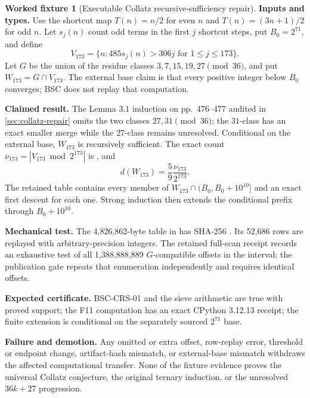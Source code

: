 \documentclass[11pt,a4paper]{article}
\theoremstyle{definition}
\newtheorem{fixture}[definition]{Worked fixture}
\theoremstyle{plain}
\theoremstyle{remark}
\begin{document}
\begin{fixture}[Executable Collatz recursive-sufficiency repair]
\label{fix:collatz-repair}
\textbf{Inputs and types.}
Use the shortcut map \(T(n)=n/2\) for even \(n\) and
\(T(n)=(3n+1)/2\) for odd \(n\).  Let \(s_j(n)\) count odd terms in the
first \(j\) shortcut steps, put \(B_0=2^{71}\), and define
\[
 V_{173}=\{n:485s_j(n)>306j\text{ for }1\le j\le173\}.
\]
Let \(G\) be the union of the residue classes
\(3,7,15,19,27\pmod {36}\), and put \(W_{173}=G\cap V_{173}\).
The external base claim is that every positive integer below \(B_0\)
converges; BSC does not replay that computation.

\textbf{Claimed result.}
The Lemma 3.1 induction on pp.\ 476--477 audited in
\cref{sec:collatz-repair} omits the two classes \(27,31\pmod {36}\);
the \(31\)-class has an exact smaller merge while the \(27\)-class remains
unresolved.  Conditional on the external base, \(W_{173}\) is recursively
sufficient.  The exact count
\(\nu_{173}=|V_{173}\bmod2^{173}|\) is
\texttt{}, and
\[
 d(W_{173})=\frac59\frac{\nu_{173}}{2^{173}}.
\]
The retained table contains every member of
\(W_{173}\cap(B_0,B_0+10^{10}]\) and an exact first descent for each one.
Strong induction then extends the conditional prefix through
\(B_0+10^{10}\).

\textbf{Mechanical test.}
The 4,826,862-byte table in
 has SHA-256
\texttt{}.
Its 52,686 rows are replayed with arbitrary-precision integers.  The retained
full-scan receipt records an exhaustive test of all 1,388,888,889
\(G\)-compatible offsets in the interval; the publication gate repeats that
enumeration independently and requires identical offsets.

\textbf{Expected certificate.}
BSC-CRS-01 and the sieve arithmetic are true with proved support; the F11
computation has an exact CPython 3.12.13 receipt; the finite extension is
conditional on the separately sourced \(2^{71}\) base.

\textbf{Failure and demotion.}
Any omitted or extra offset, row-replay error, threshold or endpoint change,
artifact-hash mismatch, or external-base mismatch withdraws the affected
computational transfer.  None of the fixture evidence proves the universal
Collatz conjecture, the original ternary induction, or the unresolved
\(36k+27\) progression.
\end{fixture}
\end{document}
